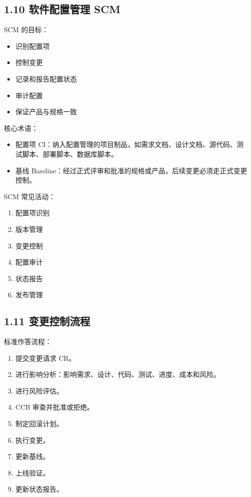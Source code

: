 \documentclass[UTF8,zihao=-4]{ctexart}
\begin{document}
\subsection{1.10 软件配置管理 SCM}

SCM 的目标：

\begin{itemize}
\item 识别配置项
\item 控制变更
\item 记录和报告配置状态
\item 审计配置
\item 保证产品与规格一致
\end{itemize}

核心术语：

\begin{itemize}
\item 配置项 CI：纳入配置管理的项目制品，如需求文档、设计文档、源代码、测试脚本、部署脚本、数据库脚本。
\item 基线 Baseline：经过正式评审和批准的规格或产品，后续变更必须走正式变更控制。
\end{itemize}

SCM 常见活动：

\begin{enumerate}
\item 配置项识别
\item 版本管理
\item 变更控制
\item 配置审计
\item 状态报告
\item 发布管理
\end{enumerate}

\subsection{1.11 变更控制流程}

标准作答流程：

\begin{enumerate}
\item 提交变更请求 CR。
\item 进行影响分析：影响需求、设计、代码、测试、进度、成本和风险。
\item 进行风险评估。
\item CCB 审查并批准或拒绝。
\item 制定回滚计划。
\item 执行变更。
\item 更新基线。
\item 上线验证。
\item 更新状态报告。
\end{enumerate}
\end{document}

